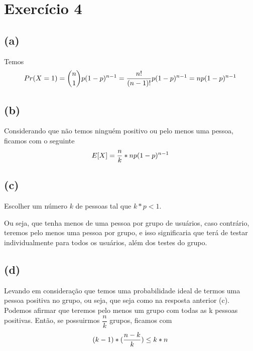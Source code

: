 \documentclass{article}
\begin{document}
\section{Exercício 4}
\subsection*{(a)}
Temos
\begin{equation}
    \notag
    Pr(X = 1) = {n \choose 1}p(1-p)^{n-1} = \dfrac{n!}{(n-1)!}p(1-p)^{n-1} = np(1-p)^{n-1}
\end{equation}

\subsection*{(b)}
Considerando que não temos ninguém positivo ou pelo menos uma pessoa, ficamos com o seguinte
\begin{equation}
    \notag
    E[X] = \dfrac{n}{k} * np(1-p)^{n-1}
\end{equation}

\subsection*{(c)}
Escolher um número $k$ de pessoas tal que $k * p < 1$. 

Ou seja, que tenha menos de uma pessoa por grupo de usuários, caso contrário,
teremos pelo menos uma pessoa por grupo, e isso significaria que terá de testar 
individualmente para todos os usuários, além dos testes do grupo.

\subsection*{(d)}
Levando em consideração que temos uma probabilidade ideal de termos uma pessoa
positiva no grupo, ou seja, que seja como na resposta anterior (c). Podemos afirmar
que teremos pelo menos um grupo com todas as k pessoas positivas. Então, se possuirmos 
$\dfrac{n}{k}$ grupos, ficamos com
\begin{equation}
    \notag
    (k-1) * (\dfrac{n - k}{k}) \leq k * n
\end{equation}
\end{document}
